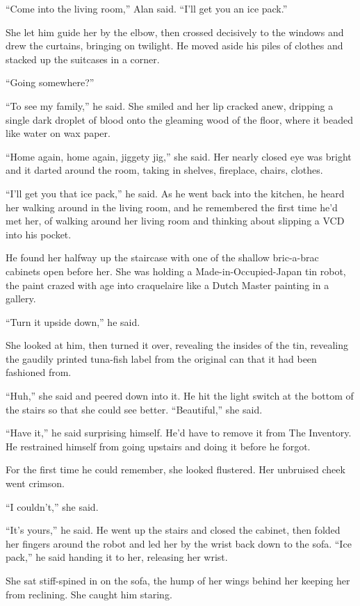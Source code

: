 \documentclass{article}
\begin{document}
``Come into the living room,'' Alan said.  ``I'll get you an ice
pack.''

She let him guide her by the elbow, then crossed decisively to the
windows and drew the curtains, bringing on twilight.  He moved aside
his piles of clothes and stacked up the suitcases in a corner.

``Going somewhere?''

``To see my family,'' he said.  She smiled and her lip cracked anew,
dripping a single dark droplet of blood onto the gleaming wood of the
floor, where it beaded like water on wax paper.

``Home again, home again, jiggety jig,'' she said.  Her nearly closed
eye was bright and it darted around the room, taking in shelves,
fireplace, chairs, clothes.

``I'll get you that ice pack,'' he said.  As he went back into the
kitchen, he heard her walking around in the living room, and he
remembered the first time he'd met her, of walking around her living
room and thinking about slipping a VCD into his pocket.

He found her halfway up the staircase with one of the shallow
bric-a-brac cabinets open before her.  She was holding a
Made-in-Occupied-Japan tin robot, the paint crazed with age into
craquelaire like a Dutch Master painting in a gallery.

``Turn it upside down,'' he said.

She looked at him, then turned it over, revealing the insides of the
tin, revealing the gaudily printed tuna-fish label from the original
can that it had been fashioned from.

``Huh,'' she said and peered down into it.  He hit the light switch at
the bottom of the stairs so that she could see better.  ``Beautiful,''
she said.

``Have it,'' he said surprising himself.  He'd have to remove it from
The Inventory.  He restrained himself from going upstairs and doing it
before he forgot.

For the first time he could remember, she looked flustered.  Her
unbruised cheek went crimson.

``I couldn't,'' she said.

``It's yours,'' he said.  He went up the stairs and closed the
cabinet, then folded her fingers around the robot and led her by the
wrist back down to the sofa.  ``Ice pack,'' he said handing it to her,
releasing her wrist.

She sat stiff-spined in on the sofa, the hump of her wings behind her
keeping her from reclining.  She caught him staring.
\end{document}
